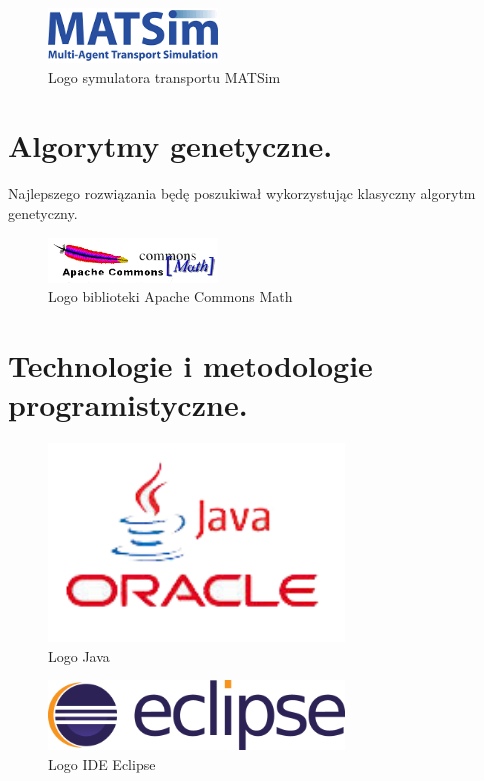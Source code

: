 \documentclass[twoside,12pt]{report}
\begin{document}
\begin{figure}[ht]
\includegraphics[width=0.40\textwidth]{img/matsim}
\caption{Logo symulatora transportu MATSim \cite{matsim}} 
\end{figure}





\section{Algorytmy genetyczne.}

Najlepszego rozwiązania będę poszukiwał wykorzystując klasyczny algorytm genetyczny.

\begin{figure}[ht]
\includegraphics[width=0.40\textwidth]{img/math}
\caption{Logo biblioteki Apache Commons Math \cite{math}} 
\end{figure}



\section{Technologie i metodologie programistyczne.}

\begin{figure}[ht]
\includegraphics[width=0.7\textwidth]{img/java}
\caption{Logo Java\cite{java}}
\end{figure}
\begin{figure}[ht]
\includegraphics[width=0.7\textwidth]{img/eclipse}
\caption{Logo IDE Eclipse\cite{eclipse}}
\end{figure}
\end{document}
